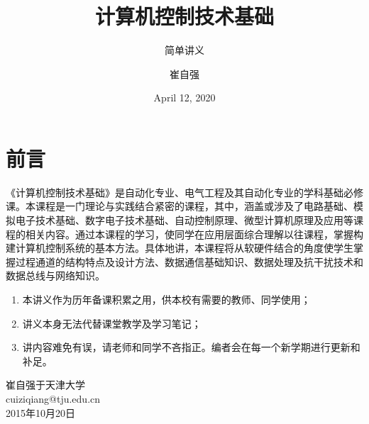 \documentclass[cn,11pt,chinese]{elegantbook}
\title{计算机控制技术基础}
\subtitle{简单讲义}
\author{崔自强}
\institute{天津大学自动化学院}
\date{April 12, 2020}
\begin{document}
\maketitle
\frontmatter

\chapter*{前言}
《计算机控制技术基础》是自动化专业、电气工程及其自动化专业的学科基础必修课。本课程是一门理论与实践结合紧密的课程，其中，涵盖或涉及了电路基础、模拟电子技术基础、数字电子技术基础、自动控制原理、微型计算机原理及应用等课程的相关内容。通过本课程的学习，使同学在应用层面综合理解以往课程，掌握构建计算机控制系统的基本方法。具体地讲，本课程将从软硬件结合的角度使学生掌握过程通道的结构特点及设计方法、数据通信基础知识、数据处理及抗干扰技术和数据总线与网络知识。

\begin{enumerate}
  \item 本讲义作为历年备课积累之用，供本校有需要的教师、同学使用；
  \item 讲义本身无法代替课堂教学及学习笔记；
  \item 讲内容难免有误，请老师和同学不吝指正。编者会在每一个新学期进行更新和补足。
\end{enumerate}
\vskip 1.5cm

\begin{flushright}
崔自强于天津大学\\cuiziqiang@tju.edu.cn\\
2015年10月20日
\end{flushright}



\tableofcontents

\mainmatter


\graphicspath{{figure/}{fig/}}









\end{document}
